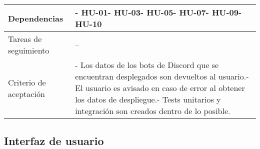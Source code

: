 \begin{table}[H]
\begin{adjustbox}{max width=\textwidth}
\begin{tabularx}{\textwidth}{|l|L|}
        Dependencias & - HU-01\linebreak - HU-03\linebreak - HU-05\linebreak - HU-07\linebreak - HU-09\linebreak - HU-10 \\ \hline
        Tareas de seguimiento & – \\ \hline
        Criterio de aceptación & - Los datos de los bots de Discord que se encuentran desplegados son devueltos al usuario.\linebreak - El usuario es avisado en caso de error al obtener los datos de despliegue.\linebreak - Tests unitarios y integración son creados dentro de lo posible. \\ \hline
    \end{tabularx}
    \end{adjustbox}
\end{table}

\subsection{Interfaz de usuario}

